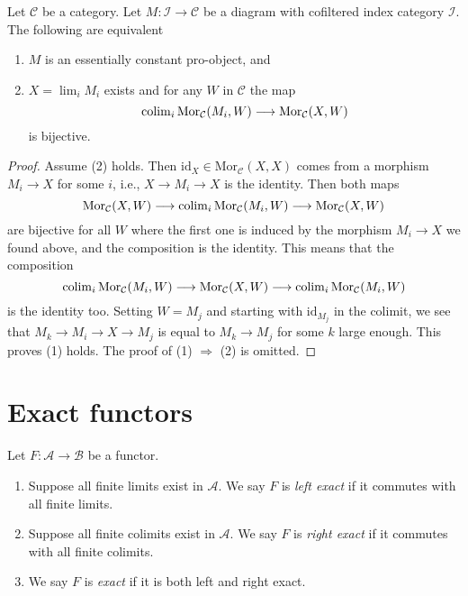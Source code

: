 \begin{lemma}
\label{lemma-characterize-essentially-constant-pro}
Let $\mathcal{C}$ be a category. Let $M : \mathcal{I} \to \mathcal{C}$
be a diagram with cofiltered index category $\mathcal{I}$.
The following are equivalent
\begin{enumerate}
\item $M$ is an essentially constant pro-object, and
\item $X = \lim_i M_i$ exists and for any $W$ in $\mathcal{C}$
the map
$$
\mathop{\rm colim}\nolimits_i \text{Mor}_{\mathcal{C}}(M_i, W)
\longrightarrow
\text{Mor}_{\mathcal{C}}(X, W)
$$
is bijective.
\end{enumerate}
\end{lemma}

\begin{proof}
Assume (2) holds. Then $\text{id}_X \in \text{Mor}_{\mathcal{C}}(X, X)$
comes from a morphism $M_i \to X$ for some $i$, i.e., $X \to M_i \to X$
is the identity. Then both maps
$$
\text{Mor}_{\mathcal{C}}(X, W)
\longrightarrow
\mathop{\rm colim}\nolimits_i \text{Mor}_{\mathcal{C}}(M_i, W)
\longrightarrow
\text{Mor}_{\mathcal{C}}(X, W)
$$
are bijective for all $W$ where the first one is induced by the morphism
$M_i \to X$ we found above, and the composition is the identity. This means
that the composition
$$
\mathop{\rm colim}\nolimits_i \text{Mor}_{\mathcal{C}}(M_i, W)
\longrightarrow
\text{Mor}_{\mathcal{C}}(X, W)
\longrightarrow
\mathop{\rm colim}\nolimits_i \text{Mor}_{\mathcal{C}}(M_i, W)
$$
is the identity too. Setting $W = M_j$ and starting with $\text{id}_{M_j}$
in the colimit, we see that $M_k \to M_i \to X \to M_j$ is equal to
$M_k \to M_j$ for some $k$ large enough. This proves (1) holds.
The proof of (1) $\Rightarrow$ (2) is omitted.
\end{proof}




\section{Exact functors}
\label{section-exact-functor}


\begin{definition}
\label{definition-exact}
Let $F : \mathcal{A} \to \mathcal{B}$ be a functor.
\begin{enumerate}
\item Suppose all finite limits exist in $\mathcal{A}$.
We say $F$ is {\it left exact} if it commutes
with all finite limits.
\item Suppose all finite colimits exist in $\mathcal{A}$.
We say $F$ is {\it right exact} if it commutes
with all finite colimits.
\item We say $F$ is {\it exact} if it is both left and right
exact.
\end{enumerate}
\end{definition}

